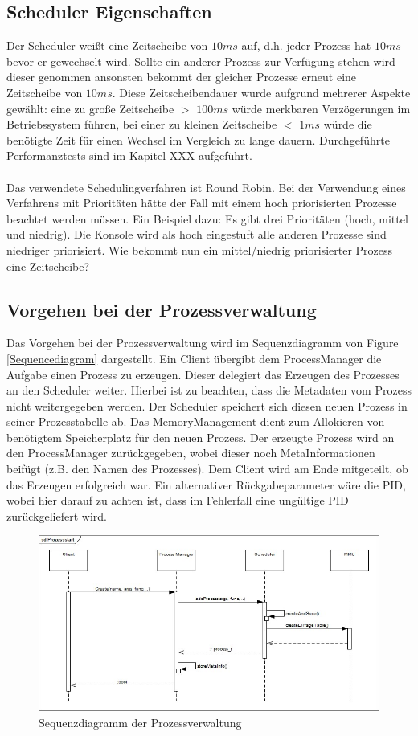 \subsection{Scheduler Eigenschaften}
\label{secScheduler}
Der Scheduler weißt eine Zeitscheibe von $10ms$ auf, d.h. jeder Prozess hat $10ms$ bevor er gewechselt wird. Sollte ein anderer Prozess zur Verfügung stehen wird dieser genommen ansonsten bekommt der gleicher Prozesse erneut eine Zeitscheibe von $10ms$. Diese Zeitscheibendauer wurde aufgrund mehrerer Aspekte gewählt: eine zu große Zeitscheibe $>$ $100ms$ würde merkbaren Verzögerungen im Betriebssystem führen, bei einer zu kleinen Zeitscheibe $<$ $1ms$ würde die benötigte Zeit für einen Wechsel im Vergleich zu lange dauern. Durchgeführte Performanztests sind im Kapitel XXX aufgeführt. \\ \\
Das verwendete Schedulingverfahren ist Round Robin. Bei der Verwendung eines Verfahrens mit Prioritäten hätte der Fall mit einem hoch priorisierten Prozesse beachtet werden müssen. Ein Beispiel dazu: Es gibt drei Prioritäten (hoch, mittel und niedrig). Die Konsole wird als hoch eingestuft alle anderen Prozesse sind niedriger priorisiert. Wie bekommt nun ein mittel/niedrig priorisierter Prozess eine Zeitscheibe?

\subsection{Vorgehen bei der Prozessverwaltung}

Das Vorgehen bei der Prozessverwaltung wird im Sequenzdiagramm von Figure \ref{Sequencediagram} dargestellt. Ein Client übergibt dem ProcessManager die Aufgabe einen Prozess zu erzeugen. Dieser delegiert das Erzeugen des Prozesses an den Scheduler weiter. Hierbei ist zu beachten, dass die Metadaten vom Prozess nicht weitergegeben werden. Der Scheduler speichert sich diesen neuen Prozess in seiner Prozesstabelle ab. Das MemoryManagement dient zum Allokieren von benötigtem Speicherplatz für den neuen Prozess. Der erzeugte Prozess wird an den ProcessManager zurückgegeben, wobei dieser noch MetaInformationen beifügt (z.B. den Namen des Prozesses). Dem Client wird am Ende mitgeteilt, ob das Erzeugen erfolgreich war. Ein alternativer Rückgabeparameter wäre die PID, wobei hier darauf zu achten ist, dass im Fehlerfall eine ungültige PID zurückgeliefert wird.

\begin{figure}[H]
	\includegraphics[scale=0.70]{chapters/processmanagement/figures/processmanagement-sequence-diagram}
	\caption{Sequenzdiagramm der Prozessverwaltung}
	\label{fig:Sequencediagram}
\end{figure}

\pagebreak 